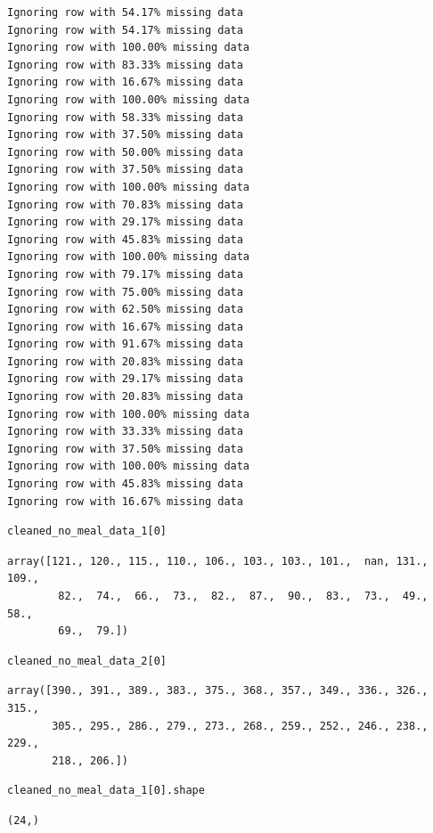\begin{verbatim}
Ignoring row with 54.17% missing data
Ignoring row with 54.17% missing data
Ignoring row with 100.00% missing data
Ignoring row with 83.33% missing data
Ignoring row with 16.67% missing data
Ignoring row with 100.00% missing data
Ignoring row with 58.33% missing data
Ignoring row with 37.50% missing data
Ignoring row with 50.00% missing data
Ignoring row with 37.50% missing data
Ignoring row with 100.00% missing data
Ignoring row with 70.83% missing data
Ignoring row with 29.17% missing data
Ignoring row with 45.83% missing data
Ignoring row with 100.00% missing data
Ignoring row with 79.17% missing data
Ignoring row with 75.00% missing data
Ignoring row with 62.50% missing data
Ignoring row with 16.67% missing data
Ignoring row with 91.67% missing data
Ignoring row with 20.83% missing data
Ignoring row with 29.17% missing data
Ignoring row with 20.83% missing data
Ignoring row with 100.00% missing data
Ignoring row with 33.33% missing data
Ignoring row with 37.50% missing data
Ignoring row with 100.00% missing data
Ignoring row with 45.83% missing data
Ignoring row with 16.67% missing data
\end{verbatim}

\begin{verbatim}
cleaned_no_meal_data_1[0]
\end{verbatim}

\begin{verbatim}
array([121., 120., 115., 110., 106., 103., 103., 101.,  nan, 131., 109.,
        82.,  74.,  66.,  73.,  82.,  87.,  90.,  83.,  73.,  49.,  58.,
        69.,  79.])
\end{verbatim}

\begin{verbatim}
cleaned_no_meal_data_2[0]
\end{verbatim}

\begin{verbatim}
array([390., 391., 389., 383., 375., 368., 357., 349., 336., 326., 315.,
       305., 295., 286., 279., 273., 268., 259., 252., 246., 238., 229.,
       218., 206.])
\end{verbatim}

\begin{verbatim}
cleaned_no_meal_data_1[0].shape
\end{verbatim}

\begin{verbatim}
(24,)
\end{verbatim}

